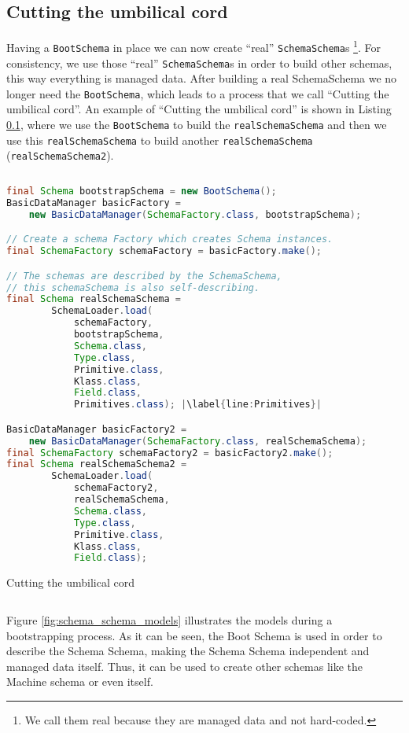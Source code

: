 \subsection{Cutting the umbilical cord}\label{subsec:Cutting the umbilical cord}
Having a \texttt{BootSchema} in place we can now create ``real'' \texttt{SchemaSchema}s \footnote{
	We call them real because they are managed data and not hard-coded.}.
For consistency, we use those ``real'' \texttt{SchemaSchema}s in order to build other schemas, this way everything is managed data.
After building a real SchemaSchema we no longer need the \texttt{BootSchema}, which leads to a process that we call ``Cutting the umbilical cord''.
An example of ``Cutting the umbilical cord'' is shown in Listing \ref{subsec:Cutting the umbilical cord}, where we use the \texttt{BootSchema} to build the \texttt{realSchemaSchema} and then we use this \texttt{realSchemaSchema} to build another \texttt{realSchemaSchema} (\texttt{realSchemaSchema2}).

\begin{sourcecode} [H]
	\begin{lstlisting}[language=Java, escapechar=|]
final Schema bootstrapSchema = new BootSchema();
BasicDataManager basicFactory = 
	new BasicDataManager(SchemaFactory.class, bootstrapSchema);

// Create a schema Factory which creates Schema instances.
final SchemaFactory schemaFactory = basicFactory.make();

// The schemas are described by the SchemaSchema, 
// this schemaSchema is also self-describing.
final Schema realSchemaSchema =
        SchemaLoader.load(
        	schemaFactory, 
        	bootstrapSchema, 
        	Schema.class, 
        	Type.class, 
        	Primitive.class, 
        	Klass.class, 
        	Field.class,
        	Primitives.class); |\label{line:Primitives}|

BasicDataManager basicFactory2 = 
	new BasicDataManager(SchemaFactory.class, realSchemaSchema);
final SchemaFactory schemaFactory2 = basicFactory2.make();
final Schema realSchemaSchema2 =
        SchemaLoader.load(
        	schemaFactory2, 
        	realSchemaSchema, 
        	Schema.class, 
        	Type.class, 
        	Primitive.class, 
        	Klass.class, 
        	Field.class);
	\end{lstlisting}
	\caption{Cutting the umbilical cord}
	\label{lst:Cutting the umbilical cord}
\end{sourcecode}

Figure \ref{fig:schema_schema_models} illustrates the models during a bootstrapping process.
As it can be seen, the Boot Schema is used in order to describe the Schema Schema, making the Schema Schema independent and managed data itself.
Thus, it can be used to create other schemas like the Machine schema or even itself.

